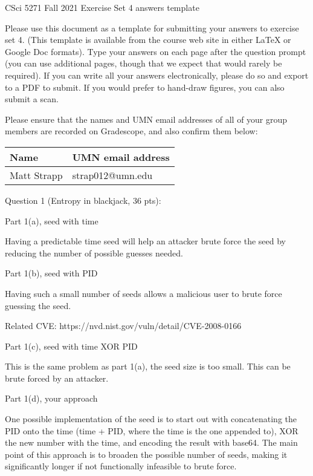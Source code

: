\documentclass[11pt]{article}
\begin{document}
\begin{center}
CSci 5271 Fall 2021 Exercise Set 4 answers template
\end{center}

Please use this document as a template for submitting your answers to
exercise set 4. (This template is available from the course web site
in either LaTeX or Google Doc formats). Type your answers on each page
after the question prompt (you can use additional pages, though that
we expect that would rarely be required). If you can write all your
answers electronically, please do so and export to a PDF to submit.
If you would prefer to hand-draw figures, you can also submit a scan.

Please ensure that the names and UMN email addresses of all of your
group members are recorded on Gradescope, and also confirm them below:

\vspace{10pt}

\begin{tabular}{|p{2.6in}|p{2.6in}|}\hline
    Name & UMN email address\\\hline
    Matt Strapp & strap012@umn.edu \\\hline
\end{tabular}

\vspace{10pt}

Question 1 (Entropy in blackjack, 36 pts):

Part 1(a), seed with time

Having a predictable time seed will help an attacker brute force the seed by reducing the number of possible guesses needed.

\vspace{2in}

Part 1(b), seed with PID

Having such a small number of seeds allows a malicious user to brute force guessing the seed.

Related CVE: https://nvd.nist.gov/vuln/detail/CVE-2008-0166

\newpage

Part 1(c), seed with time XOR PID

This is the same problem as part 1(a), the seed size is too small. This can be brute forced by an attacker.

\vspace{3in}

Part 1(d), your approach

One possible implementation of the seed is to start out with concatenating the PID onto the time (time + PID, where the time is the one appended to), XOR the new number with the time, and encoding the result with base64.
The main point of this approach is to broaden the possible number of seeds, making it significantly longer if not functionally infeasible to brute force.
\end{document}
